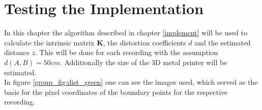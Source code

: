 \section{Testing the Implementation}

In this chapter the algorithm described in chapter \ref{implement} will be used to calculate the intrinsic matrix \textbf{K}, the distortion coefficients $d$ and the estimated distance $z$. This will be done for each recording with the assumption $d(A, B) = 50cm$. Additionally the size of the 3D metal printer will be estimated.\\

In figure \ref{group_fig:dist_green} one can see the images used, which served as the basis for the pixel coordinates of the boundary points for the respective recording.
\vspace{\baselineskip}

